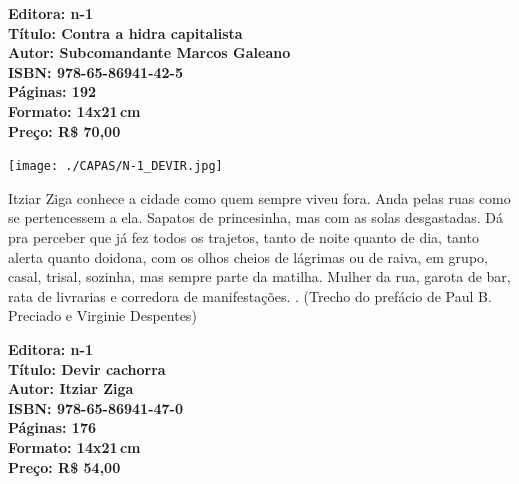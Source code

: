 \vfill

\hspace*{-.4cm}\begin{minipage}[c]{.5\linewidth}
\small\textbf{
\hspace*{-.1cm}Editora: n-1\\
Título: Contra a hidra capitalista\\
Autor: Subcomandante Marcos Galeano\\ 
ISBN: 978-65-86941-42-5\\
Páginas: 192\\
Formato: 14x21\,cm\\
Preço: R\$ 70,00\\
}
\end{minipage}

\pagebreak

\begin{center}
\hspace*{.5cm}\texttt{[image: ./CAPAS/N-1\_DEVIR.jpg]}
\end{center}

\hspace*{-7cm}\hrulefill\hspace*{-7cm}

\medskip

\noindent{}Itziar Ziga conhece a cidade como quem sempre viveu fora. Anda pelas ruas como se pertencessem a ela. Sapatos de princesinha, mas com as solas desgastadas. Dá pra perceber que já fez todos os trajetos, tanto de noite quanto de dia, tanto alerta quanto doidona, com os olhos cheios de lágrimas ou de raiva, em grupo, casal, trisal, sozinha, mas sempre parte da matilha. Mulher da rua, garota de bar, rata de livrarias e corredora de manifestações. . (Trecho do prefácio de Paul B. Preciado e Virginie Despentes)

\vfill

\hspace*{-.4cm}\begin{minipage}[c]{.5\linewidth}
\small\textbf{
\hspace*{-.1cm}Editora: n-1\\
Título: Devir cachorra\\
Autor: Itziar Ziga\\
ISBN: 978-65-86941-47-0\\
Páginas: 176\\
Formato: 14x21\,cm\\
Preço: R\$ 54,00\\
}
\end{minipage}

